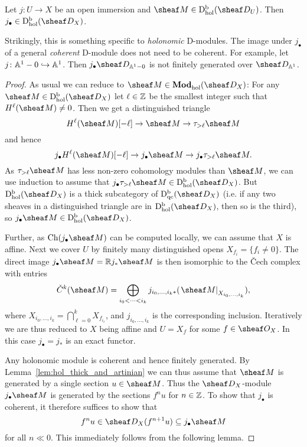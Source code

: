 \documentclass[number-in-sections,a4paper]{notes}
\begin{document}
\begin{Lemma}\label{lem:j_*holonomic}
    Let $j\colon U \to X$ be an open immersion and $\sheaf M \in \catDbDModhol{U}$.
    Then $j_\bullet \in \catDbDModhol{X}$.
\end{Lemma}

\begin{Example}
    Strikingly, this is something specific to \emph{holonomic} D-modules.
    The image under $j_\bullet$ of a general \emph{coherent} D-module does not need to be coherent.
    For example, let $j\colon \mathbb A^{1}_{} - 0 \hookrightarrow \mathbb A^{1}_{}$.
    Then $j_\bullet \sD_{\as 1\setminus 0}$ is not finitely generated over $\sD_{\as 1}$.
\end{Example}

\begin{proof}
    As usual we can reduce to $\sheaf M \in \catDModhol{X}$:
    For any $\sheaf M \in \catDbDModhol{X}$ let $\ell \in {\mathbb{Z}}$ be the smallest integer such that $H^\ell(\sheaf M) \ne 0$.
    Then we get a distinguished triangle
    \[
        H^\ell(\sheaf M)[-\ell] \to \sheaf M \to \tau_{> \ell}\sheaf M
    \]
    and hence
    \[
        j_\bullet H^\ell(\sheaf M)[-\ell] \to j_\bullet \sheaf M \to j_\bullet \tau_{>\ell}\sheaf M.
    \]
    As $\tau_{>\ell}\sheaf M$ has less non-zero cohomology modules than $\sheaf M$, we can use induction to assume that $j_\bullet \tau_{>\ell}\sheaf M \in \catDbDModhol{X}$.
    But $\catDbDModhol{X}$ is a thick subcategory of $\catDbDModqc{X}$ (i.e. if any two sheaves in a distinguished triangle are in $\catDbDModhol{X}$, then so is the third), so $j_\bullet\sheaf M \in \catDbDModhol{X}$.

    Further, as $\Ch(j_\bullet \sheaf M)$ can be computed locally, we can assume that $X$ is affine.
    Next we cover $U$ by finitely many distinguished opens $X_{f_i} = \{ f_i \ne 0 \}$.
    The direct image $j_\bullet\sheaf M = \RR j_*\sheaf M$ is then isomorphic to the Čech complex with entries
    \[
        \check C^k(\sheaf M) = \bigoplus_{i_0 < \dots < i_k} j_{i_0,\dots,i_k *}(\res{\sheaf M}{X_{i_0,\dots,i_k}}),
    \]
    where $X_{i_0,\dots,i_k} = \bigcap_{\ell = 0}^k X_{f_{i_\ell}}$, and $j_{i_0,\dots,i_k}$ is the corresponding inclusion.
    Iteratively we are thus reduced to $X$ being affine and $U = X_f$ for some $f \in \sO_X$.
    In this case $j_\bullet = j_*$ is an exact functor.

    Any holonomic module is coherent and hence finitely generated.
    By Lemma~\ref{lem:hol_thick_and_artinian} we can thus assume that $\sheaf M$ is generated by a single section $u \in \sheaf M$.
    Thus the $\sD_X$-module $j_\bullet\sheaf M$ is generated by the sections $f^nu$ for $n \in {\mathbb{Z}}$.
    To show that $j_\bullet$ is coherent, it therefore suffices to show that
    \[
        f^nu \in \sD_X(f^{n+1}u) \subseteq j_\bullet\sheaf M
    \]
    for all $n \ll 0$.
    This immediately follows from the following lemma.


\end{proof}
\end{document}
